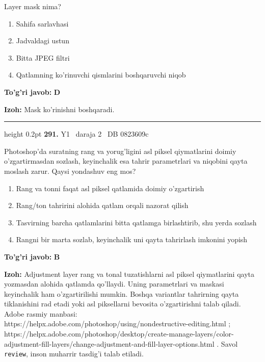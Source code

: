 \documentclass[10pt,a4paper,oneside]{article}
\begin{document}
\par
Layer mask nima?
\begin{enumerate}[label=\Alph*),leftmargin=9mm]
\item Sahifa sarlavhasi
\item Jadvaldagi ustun
\item Bitta JPEG filtri
\item Qatlamning ko'rinuvchi qismlarini boshqaruvchi niqob
\end{enumerate}
\begin{tcolorbox}[enhanced,breakable,colback=teal!4,colframe=teal!45!black,boxrule=0.45pt,arc=1.2mm,left=2.8mm,right=2.8mm,top=2mm,bottom=2mm,before skip=2mm,after skip=2mm]
\textbf{\color{teal}To'g'ri javob:} \textbf{D}
\par\smallskip
\textbf{Izoh:} Mask ko'rinishni boshqaradi.
\end{tcolorbox}
\vspace{2mm}\hrule height 0.2pt \vspace{4mm}
\hypertarget{q291}{\textbf{\color{ink}291.}}  {\color{muted}\scriptsize Y1 \textbullet\ daraja 2 \textbullet\ DB 0823609c}
\par
Photoshop'da suratning rang va yorug'ligini asl piksel qiymatlarini doimiy o'zgartirmasdan sozlash, keyinchalik esa tahrir parametrlari va niqobini qayta moslash zarur. Qaysi yondashuv eng mos?
\begin{enumerate}[label=\Alph*),leftmargin=9mm]
\item Rang va tonni faqat asl piksel qatlamida doimiy o'zgartirish
\item Rang/ton tahririni alohida qatlam orqali nazorat qilish
\item Tasvirning barcha qatlamlarini bitta qatlamga birlashtirib, shu yerda sozlash
\item Rangni bir marta sozlab, keyinchalik uni qayta tahrirlash imkonini yopish
\end{enumerate}
\begin{tcolorbox}[enhanced,breakable,colback=teal!4,colframe=teal!45!black,boxrule=0.45pt,arc=1.2mm,left=2.8mm,right=2.8mm,top=2mm,bottom=2mm,before skip=2mm,after skip=2mm]
\textbf{\color{teal}To'g'ri javob:} \textbf{B}
\par\smallskip
\textbf{Izoh:} Adjustment layer rang va tonal tuzatishlarni asl piksel qiymatlarini qayta yozmasdan alohida qatlamda qo'llaydi. Uning parametrlari va maskasi keyinchalik ham o'zgartirilishi mumkin. Boshqa variantlar tahrirning qayta tiklanishini rad etadi yoki asl piksellarni bevosita o'zgartirishni talab qiladi. Adobe rasmiy manbasi: https://helpx.adobe.com/photoshop/using/nondestructive-editing.html ; https://helpx.adobe.com/photoshop/desktop/create-manage-layers/color-adjustment-fill-layers/change-adjustment-and-fill-layer-options.html . Savol \texttt{review}, inson muharrir tasdig'i talab etiladi.
\end{tcolorbox}
\end{document}
